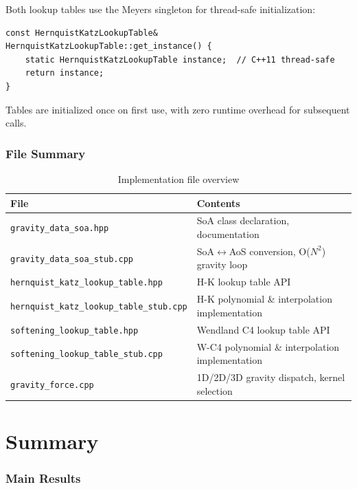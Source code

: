 \documentclass[12pt]{article}
\begin{document}
Both lookup tables use the Meyers singleton for thread-safe initialization:
\begin{verbatim}
const HernquistKatzLookupTable& HernquistKatzLookupTable::get_instance() {
    static HernquistKatzLookupTable instance;  // C++11 thread-safe
    return instance;
}
\end{verbatim}

Tables are initialized once on first use, with zero runtime overhead for subsequent calls.

\section{File Summary}

\begin{table}[h]
\centering
\small
\begin{tabular}{lp{6cm}}
\toprule
\textbf{File} & \textbf{Contents} \\
\midrule
\texttt{gravity\_data\_soa.hpp} & SoA class declaration, documentation \\
\texttt{gravity\_data\_soa\_stub.cpp} & SoA$\leftrightarrow$AoS conversion, O($N^2$) gravity loop \\
\texttt{hernquist\_katz\_lookup\_table.hpp} & H-K lookup table API \\
\texttt{hernquist\_katz\_lookup\_table\_stub.cpp} & H-K polynomial \& interpolation implementation \\
\texttt{softening\_lookup\_table.hpp} & Wendland C4 lookup table API \\
\texttt{softening\_lookup\_table\_stub.cpp} & W-C4 polynomial \& interpolation implementation \\
\texttt{gravity\_force.cpp} & 1D/2D/3D gravity dispatch, kernel selection \\
\bottomrule
\end{tabular}
\caption{Implementation file overview}
\end{table}

\part{Summary}

\section{Main Results}
\end{document}
